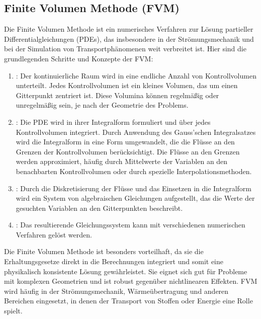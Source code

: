 \documentclass[letterpaper,10pt,german]{jupyterBook}
\begin{document}
\subsection{Finite Volumen Methode (FVM)}
\label{\detokenize{chapters/chapter1/Einf_xfchrung_Loesungsverfahren:finite-volumen-methode-fvm}}
\sphinxAtStartPar
Die Finite Volumen Methode  ist ein numerisches Verfahren zur Lösung partieller Differentialgleichungen (PDEs), das insbesondere in der Strömungsmechanik und bei der Simulation von Transportphänomenen weit verbreitet ist. Hier sind die grundlegenden Schritte und Konzepte der FVM:
\begin{enumerate}
%
\item {} 
\sphinxAtStartPar
{}: Der kontinuierliche Raum wird in eine endliche Anzahl von Kontrollvolumen unterteilt. Jedes Kontrollvolumen ist ein kleines Volumen, das um einen Gitterpunkt zentriert ist. Diese Volumina können regelmäßig oder unregelmäßig sein, je nach der Geometrie des Problems.

\item {} 
\sphinxAtStartPar
{}: Die PDE wird in ihrer Integralform formuliert und über jedes Kontrollvolumen integriert. Durch Anwendung des Gauss’schen Integralsatzes wird die Integralform in eine Form umgewandelt, die die Flüsse an den Grenzen der Kontrollvolumen berücksichtigt. Die Flüsse an den Grenzen werden approximiert, häufig durch Mittelwerte der Variablen an den benachbarten Kontrollvolumen oder durch spezielle Interpolationsmethoden.

\item {} 
\sphinxAtStartPar
{}: Durch die Diskretisierung der Flüsse und das Einsetzen in die Integralform wird ein System von algebraischen Gleichungen aufgestellt, das die Werte der gesuchten Variablen an den Gitterpunkten beschreibt.

\item {} 
\sphinxAtStartPar
{}: Das resultierende Gleichungssystem kann mit verschiedenen numerischen Verfahren gelöst werden.

\end{enumerate}

\sphinxAtStartPar
Die Finite Volumen Methode ist besonders vorteilhaft, da sie die Erhaltungsgesetze direkt in die Berechnungen integriert und somit eine physikalisch konsistente Lösung gewährleistet. Sie eignet sich gut für Probleme mit komplexen Geometrien und ist robust gegenüber nichtlinearen Effekten. FVM wird häufig in der Strömungsmechanik, Wärmeübertragung und anderen Bereichen eingesetzt, in denen der Transport von Stoffen oder Energie eine Rolle spielt.
\end{document}
